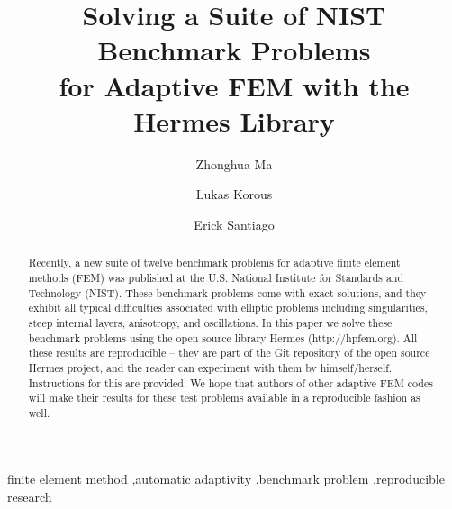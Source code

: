 \documentclass[12pt]{elsarticle}
\begin{document}
\begin{frontmatter}



\title{Solving a Suite of NIST Benchmark Problems\\ for Adaptive FEM with the Hermes Library}

\author[label1]{Zhonghua Ma}
\author[label2]{Lukas Korous}
\author[label3]{Erick Santiago}
\address[label1]{China University of Petroleum, Beijing, China}
\address[label2]{Charles University, Prague, Czech Republic}
\address[label3]{University of Nevada, Reno, USA}

\begin{abstract}
Recently, a new suite of twelve benchmark problems for adaptive finite element methods (FEM)
was published at the U.S. National Institute for Standards and Technology (NIST).
These benchmark problems come with exact solutions, and they exhibit all typical difficulties
associated with elliptic problems including singularities, steep internal layers, anisotropy,
and oscillations. In this paper we solve these benchmark problems using the open source
library Hermes (http://hpfem.org). All these results are reproducible -- they are part of
the Git repository of the open source Hermes project, and the reader can experiment
with them by himself/herself. Instructions for this are provided. We hope that authors
of other adaptive FEM codes will make their results for these test problems available
in a reproducible fashion as well.
\end{abstract}

\begin{keyword}
finite element method \sep automatic adaptivity \sep benchmark problem \sep reproducible research
\end{keyword}

\end{frontmatter}
\end{document}
